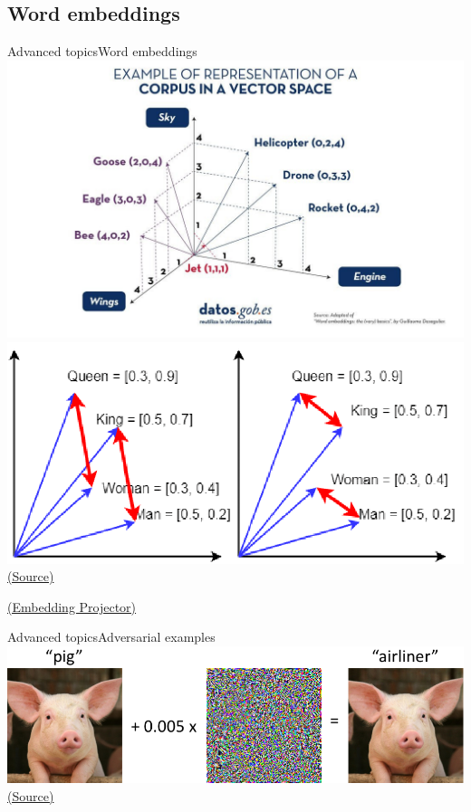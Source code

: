 \documentclass[10pt,compress]{beamer} %
\begin{document}
\subsection{Word embeddings}
\begin{frame}{Advanced topics}{Word embeddings}
	\centering\includegraphics[width=0.5\linewidth]{figs/word.jpg}\\
	\centering\includegraphics[width=0.5\linewidth]{figs/queen-example.png}\\
	\scriptsize\href{https://pantelis.github.io/cs634/docs/common/lectures/nlp/word2vec/}{(Source)}

	\normalsize
	\href{https://projector.tensorflow.org/}{(Embedding Projector)}
\end{frame}




\begin{frame}{Advanced topics}{Adversarial examples}
	\centering\includegraphics[width=0.7\linewidth]{figs/adversarial.png}\\
	\scriptsize\href{https://medium.com/attentive-ai/fooling-cnns-via-adversarial-examples-877a9e0ee84e}{(Source)}
\end{frame}
\end{document}
